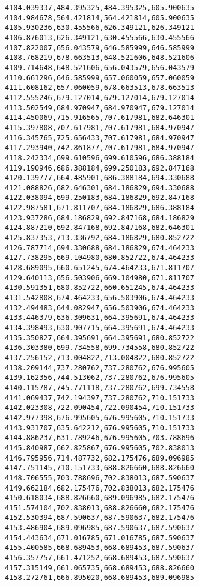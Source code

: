 \documentclass[11pt]{article}
\begin{document}
\begin{Verbatim}[commandchars=\\\{\}]
4104.039337,484.395325,484.395325,605.900635
4104.984678,564.421814,564.421814,605.900635
4105.930236,630.455566,626.349121,626.349121
4106.876013,626.349121,630.455566,630.455566
4107.822007,656.043579,646.585999,646.585999
4108.768219,678.663513,648.521606,648.521606
4109.714648,648.521606,656.043579,656.043579
4110.661296,646.585999,657.060059,657.060059
4111.608162,657.060059,678.663513,678.663513
4112.555246,679.127014,679.127014,679.127014
4113.502549,684.970947,684.970947,679.127014
4114.450069,715.916565,707.617981,682.646301
4115.397808,707.617981,707.617981,684.970947
4116.345765,725.656433,707.617981,684.970947
4117.293940,742.861877,707.617981,684.970947
4118.242334,699.610596,699.610596,686.388184
4119.190946,686.388184,699.250183,692.847168
4120.139777,664.485901,686.388184,694.330688
4121.088826,682.646301,684.186829,694.330688
4122.038094,699.250183,684.186829,692.847168
4122.987581,671.811707,684.186829,686.388184
4123.937286,684.186829,692.847168,684.186829
4124.887210,692.847168,692.847168,682.646301
4125.837353,713.336792,684.186829,680.852722
4126.787714,694.330688,684.186829,674.464233
4127.738295,669.104980,680.852722,674.464233
4128.689095,660.651245,674.464233,671.811707
4129.640113,656.503906,669.104980,671.811707
4130.591351,680.852722,660.651245,674.464233
4131.542808,674.464233,656.503906,674.464233
4132.494483,644.082947,656.503906,674.464233
4133.446379,636.309631,664.395691,674.464233
4134.398493,630.907715,664.395691,674.464233
4135.350827,664.395691,664.395691,680.852722
4136.303380,699.734558,699.734558,680.852722
4137.256152,713.004822,713.004822,680.852722
4138.209144,737.280762,737.280762,676.995605
4139.162356,744.513062,737.280762,676.995605
4140.115787,745.771118,737.280762,699.734558
4141.069437,742.194397,737.280762,710.151733
4142.023308,722.090454,722.090454,710.151733
4142.977398,676.995605,676.995605,710.151733
4143.931707,635.642212,676.995605,710.151733
4144.886237,631.789246,676.995605,703.788696
4145.840987,662.825867,676.995605,702.838013
4146.795956,714.487732,682.175476,689.096985
4147.751145,710.151733,688.826660,688.826660
4148.706555,703.788696,702.838013,687.590637
4149.662184,682.175476,702.838013,682.175476
4150.618034,688.826660,689.096985,682.175476
4151.574104,702.838013,688.826660,682.175476
4152.530394,687.590637,687.590637,682.175476
4153.486904,689.096985,687.590637,687.590637
4154.443634,671.016785,671.016785,687.590637
4155.400585,668.689453,668.689453,687.590637
4156.357757,661.471252,668.689453,687.590637
4157.315149,661.065735,668.689453,688.826660
4158.272761,666.895020,668.689453,689.096985

\end{Verbatim}
\end{document}
